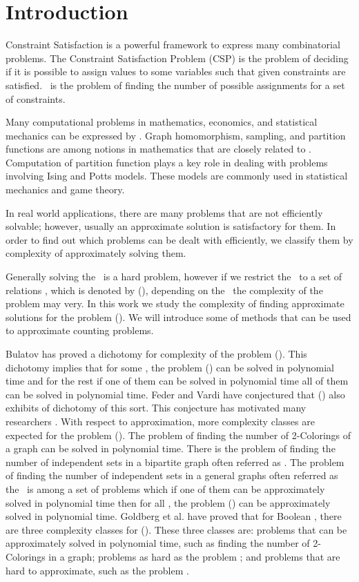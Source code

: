 \chapter{Introduction}
Constraint Satisfaction is a powerful framework to express many combinatorial problems.
The Constraint Satisfaction Problem (CSP) is the problem of deciding if it is possible to
assign values to some variables such that given constraints are satisfied. \ccsp\ 
is the problem of finding the number of possible assignments for a set of constraints.

Many computational problems in mathematics, economics, and statistical mechanics
can be expressed by \ccsp\@. Graph homomorphism, sampling,
and partition functions are among notions in mathematics
that are closely related to \ccsp\@. Computation of partition function plays a key role
in dealing with problems involving Ising and Potts models. These models are
commonly used in statistical mechanics and game theory.
 
In real world applications, there are many problems that are not efficiently solvable;
however, usually an approximate solution is satisfactory for them. 
In order to find out which problems can be dealt with efficiently, we classify them
by complexity of approximately solving them.

Generally solving the \ccsp\ is a hard problem, however if we restrict the
\ccsp\ to a set of relations \mrelset, which is denoted by \ccsp(\mrelset),
depending on the \mrelset\ the complexity of the problem may very.
In this work we study the complexity of finding approximate solutions for the 
problem \ccsp(\mrelset).
We will introduce some of methods that can be used to approximate counting problems.

Bulatov \cite{Bulatov} has proved a dichotomy for complexity of the
problem \ccsp(\mrelset). This dichotomy implies that 
for some \mrelset, the problem \ccsp(\mrelset) can be solved in polynomial time
and for the rest if one of them can be solved in polynomial time
all of them can be solved in polynomial time.
Feder and Vardi \cite{cspconj} have conjectured that \ccsp(\mrelset) also exhibits of dichotomy of
this sort. This conjecture has motivated many researchers \cite{dur628, recent08, valeriote}.
With respect to approximation, more complexity classes are expected for the problem \ccsp(\mrelset).
The problem of finding the number of 2-Colorings of a graph can be solved 
in polynomial time. There is the problem of finding the
number of independent sets in a bipartite graph often referred as \cbis\@.
The problem of finding the number of independent sets in a general graphs often referred as
the \cisp\ is among a set of problems which if one of them can be approximately solved
in polynomial time then for all \mrelset, the problem \ccsp(\mrelset) can be approximately
solved in polynomial time.
Goldberg et al. \cite{Trichotomy} have proved that for Boolean \mrelset,
there are three complexity classes for \ccsp(\mrelset)\@. These three classes are:
problems that can be approximately solved in polynomial time, such as finding the
number of 2-Colorings in a graph; problems as hard as the problem \cbis; and
problems that are hard to approximate, such as the problem \cisp\@.

